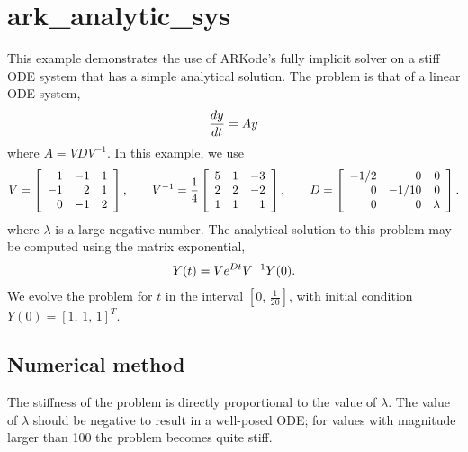 \documentclass[letterpaper,10pt,english]{sphinxmanual}
\begin{document}
\section{ark\_analytic\_sys}
\label{cpp_serial:ark-analytic-sys}\label{cpp_serial:id1}
This example demonstrates the use of ARKode's fully implicit solver on
a stiff ODE system that has a simple analytical solution.  The problem
is that of a linear ODE system,
\begin{gather}
\begin{split}\frac{dy}{dt} = Ay\end{split}\notag
\end{gather}
where \(A = V D V^{-1}\).  In this example, we use
\begin{gather}
\begin{split}V = \left[\begin{array}{rrr} 1 & -1 & 1\\ -1 & 2 & 1\\ 0 & -1 & 2
    \end{array}\right], \qquad
V^{-1} = \frac14 \left[\begin{array}{rrr} 5 & 1 & -3\\ 2 & 2 & -2\\
    1 & 1 & 1 \end{array}\right], \qquad
D = \left[\begin{array}{rrr} -1/2 & 0 & 0\\ 0 & -1/10 & 0\\ 0 & 0 &
    \lambda \end{array}\right].\end{split}\notag
\end{gather}
where \(\lambda\) is a large negative number. The analytical
solution to this problem may be computed using the matrix exponential,
\begin{gather}
\begin{split}Y(t) = V e^{Dt} V^{-1} Y(0).\end{split}\notag
\end{gather}
We evolve the problem for \(t\) in the interval \(\left[0,\,
\frac{1}{20}\right]\), with initial condition \(Y(0) = \left[1,\,
1,\, 1\right]^T\).


\subsection{Numerical method}
\label{cpp_serial:numerical-method}
The stiffness of the problem is directly proportional to the
value of \(\lambda\).  The value of \(\lambda\) should be
negative to result in a well-posed ODE; for values with magnitude
larger than 100 the problem becomes quite stiff.
\end{document}
